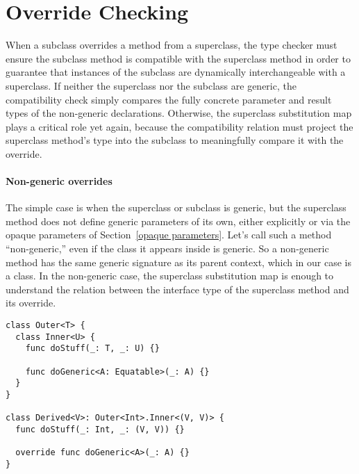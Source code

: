 \documentclass[a4paper,headsepline,bibliography=totoc,toc=flat,fleqn,twoside=semi]{scrbook}
\theoremstyle{definition}
\theoremstyle{definition}
\theoremstyle{definition}
\newcommand{\ifWIP}{\iffalse}
\begin{document}
\section{Override Checking}\label{overridechecking}

\ifWIP

When a subclass overrides a method from a superclass, the type checker must ensure the subclass method is compatible with the superclass method in order to guarantee that instances of the subclass are dynamically interchangeable with a superclass. If neither the superclass nor the subclass are generic, the compatibility check simply compares the fully concrete parameter and result types of the non-generic declarations. Otherwise, the superclass substitution map plays a critical role yet again, because the compatibility relation must project the superclass method's type into the subclass to meaningfully compare it with the override.

\paragraph{Non-generic overrides}
The simple case is when the superclass or subclass is generic, but the superclass method does not define generic parameters of its own, either explicitly or via the opaque parameters of Section~\ref{opaque parameters}. Let's call such a method ``non-generic,'' even if the class it appears inside is generic. So a non-generic method has the same generic signature as its parent context, which in our case is a class. In the non-generic case, the superclass substitution map is enough to understand the relation between the interface type of the superclass method and its override.

\begin{listing}\label{method overrides}
\begin{Verbatim}
class Outer<T> {
  class Inner<U> {
    func doStuff(_: T, _: U) {}

    func doGeneric<A: Equatable>(_: A) {}
  }
}

class Derived<V>: Outer<Int>.Inner<(V, V)> {
  func doStuff(_: Int, _: (V, V)) {}

  override func doGeneric<A>(_: A) {}
}
\end{Verbatim}
\end{listing}
\end{document}
